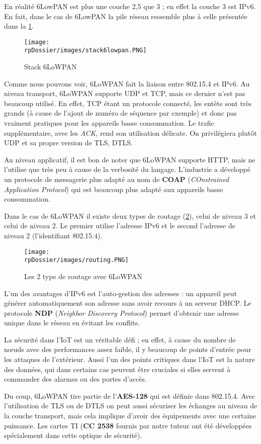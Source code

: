 En réalité 6LowPAN est plus une couche 2,5 que 3 ; en effet la couche 3 est IPv6. En fait, dans le cas de 6LowPAN la pile réseau ressemble plus à celle présentée dans la \cref{stack6lowpan}.

\begin{figure}[H]
\centering
\texttt{[image: \\rpDossier/images/stack6lowpan.PNG]}
\caption{Stack 6LoWPAN}
\label{stack6lowpan}
\end{figure}

Comme nous pouvons voir, 6LoWPAN fait la liaison entre 802.15.4 et IPv6. Au niveau transport, 6LoWPAN supporte UDP et TCP, mais ce dernier n'est pas beaucoup utilisé. En effet, TCP étant un protocole connecté, les entête sont très grands (à cause de l'ajout de numéro de séquence par exemple) et donc pas vraiment pratiques pour les appareils basse consommation. Le trafic supplémentaire, avec les \textit{ACK}, rend son utilisation délicate. On privilégiera plutôt UDP et sa propre version de TLS, DTLS. 

Au niveau applicatif, il est bon de noter que 6LoWPAN supporte HTTP, mais ne l'utilise que très peu à cause de la verbosité du langage. L'industrie a développé un protocole de messagerie plus adapté au nom de \textbf{COAP} (\textit{COnstrained Application Protocol}) qui est beaucoup plus adapté aux appareils basse consommation.



Dans le cas de 6LoWPAN il existe deux types de routage (\cref{routing}), celui de niveau 3 et celui de niveau 2. Le premier utilise l'adresse IPv6 et le second l'adresse de niveau 2 (l'identifiant 802.15.4).

\begin{figure}[H]
\centering
\texttt{[image: \\rpDossier/images/routing.PNG]}
\caption{Les 2 type de routage avec 6LoWPAN}
\label{routing}
\end{figure}

L'un des avantages d'IPv6 est l'auto-gestion des adresses : un appareil peut générer automatiquement son adresse sans avoir recours à un serveur DHCP. Le protocole \textbf{NDP} (\textit{Neighbor Discovery Protocol}) permet d'obtenir une adresse unique dans le réseau en évitant les conflits.

La sécurité dans l'IoT est un véritable défi ; en effet, à cause du nombre de nœuds avec des performances assez faible, il y beaucoup de points d'entrée pour les attaques de l'extérieur. Aussi l'un des points critiques dans l'IoT est la nature des données, qui dans certains cas peuvent être cruciales si elles servent à commander des alarmes ou des portes d'accès.

Du coup, 6LoWPAN tire partie de l'\textbf{AES-128} qui est définie dans 802.15.4. Avec l'utilisation de TLS ou de DTLS on peut aussi sécuriser les échanges au niveau de la couche transport, mais cela implique d'avoir des équipements avec une certaine puissance. Les cartes TI (\textbf{CC 2538} fournis par notre tuteur ont été développées spécialement dans cette optique de sécurité).
